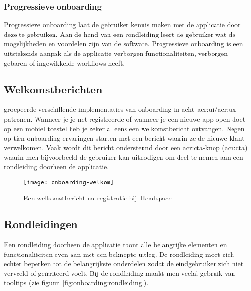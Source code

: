 \subsubsection{Progressieve onboarding}
\label{sec:onboarding:types:progressief}

Progressieve onboarding laat de gebruiker kennis maken met de applicatie door deze te gebruiken. Aan de hand van een rondleiding leert de gebruiker wat de mogelijkheden en voordelen zijn van de software. Progressieve onboarding is een uitstekende aanpak als de applicatie verborgen functionaliteiten, verborgen gebaren of ingewikkelde workflows heeft.

\subsection{Welkomstberichten}
\label{sec:onboarding:welkomstberichten}

\textcite{Balboni2018} groepeerde verschillende implementaties van onboarding in acht~\acrshort{acr:ui}/\acrshort{acr:ux} patronen. Wanneer je je net registreerde of wanneer je een nieuwe app open doet op een mobiel toestel heb je zeker al eens een welkomstbericht ontvangen. Negen op tien onboarding-ervaringen starten met een bericht waarin ze de nieuwe klant verwelkomen. Vaak wordt dit bericht ondersteund door een \acrshort{acr:cta}-knop (\acrlong{acr:cta}) waarin men bijvoorbeeld de gebruiker kan uitnodigen om deel te nemen aan een rondleiding doorheen de applicatie.

\begin{figure}[h!]
    \centering
    \texttt{[image: onboarding-welkom]}
    \caption[Voorbeeld welkomstbericht]{Een welkomstbericht na registratie bij~\href{https://www.headspace.com/}{Headspace}}
    \label{fig:onboarding:welkom}
\end{figure}

\subsection{Rondleidingen}
\label{sec:onboarding:rondleidingen}

Een rondleiding doorheen de applicatie toont alle belangrijke elementen en functionaliteiten even aan met een beknopte uitleg. De rondleiding moet zich echter beperken tot de belangrijkste onderdelen zodat de eindgebruiker zich niet verveeld of geïrriteerd voelt. Bij de rondleiding maakt men veelal gebruik van tooltips (zie figuur~\ref{fig:onboarding:rondleiding}).

